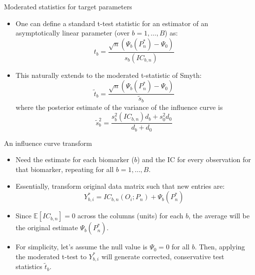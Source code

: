 \documentclass[12pt,t,handout]{beamer}
\begin{document}
\begin{frame}[c]{Moderated statistics for target parameters}

\begin{center}
\begin{itemize}
  \itemsep12pt
  \item One can define a standard t-test statistic for an estimator of an
    asymptotically linear parameter (over $b = 1, \dots, B$) as:
    \[
      t_b = \frac{\sqrt{n}(\Psi_b(P_n^*) - \Psi_0)}{s_b(IC_{b,n})}
    \]
  \item This naturally extends to the moderated t-statistic of Smyth:
    \[
      \tilde{t}_b = \frac{\sqrt{n}(\Psi_b(P_n^*) - \Psi_0)}{\tilde{s}_b}
    \]
    where the posterior estimate of the variance of the influence curve is
    \[
      \tilde{s}^2_b = \frac{s^2_b(IC_{b,n})d_b + s^2_0d_0}{d_b + d_0}
    \]
\end{itemize}
\end{center}

\end{frame}



\begin{frame}[c]{An influence curve transform}

\begin{center}
\begin{itemize}
  \itemsep12pt
  \item Need the estimate for each biomarker ($b$) and the IC for every
    observation for that biomarker, repeating for all $b = 1, \dots, B$.
  \item Essentially, transform original data matrix such that new entries are:
    \[
      Y^*_{b,i} = IC_{b,n}(O_i; P_n) + \Psi_b(P_n^*)
     \]
 \item Since $\mathbb{E}[IC_{b,n}] = 0$ across the columns (units) for each $b$,
   the average will be the original estimate $\Psi_b(P_n^*)$.
  \item For simplicity, let's assume the null value is $\Psi_0 = 0$ for all $b$.
    Then, applying the moderated t-test to $Y^*_{b,i}$ will generate corrected,
    conservative test statistics $\tilde{t}_b$.
\end{itemize}
\end{center}

\end{frame}
\end{document}
